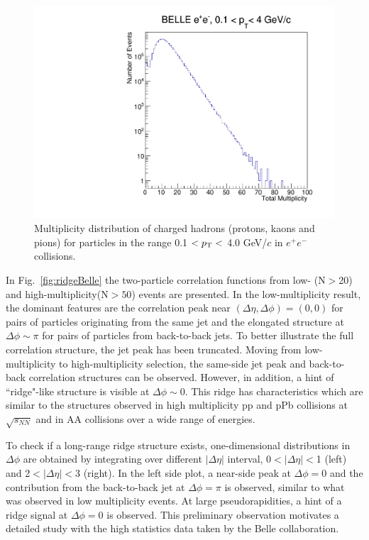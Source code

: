 \begin{figure}[!htb]
\begin{center}
\includegraphics[width=.45\textwidth]{figures/total_mult.pdf}
\caption{Multiplicity distribution of charged hadrons (protons, kaons and pions) for  particles in the range  0.1 $<p_{\rm T}<$ 4.0 GeV/$c$ in $e^{+}e^{-}$ collisions. }
\label{fig:multHadron} 
\end{center}
\end{figure}

In Fig.~\ref{fig:ridgeBelle} the two-particle correlation functions from low- (N$>$20) and high-multiplicity(N$>50$) events are presented. 
In the low-multiplicity result, the dominant features are the correlation peak near $(\Delta\eta,\Delta\phi)=(0,0)$ for pairs of particles originating from the same jet 
and the elongated structure at $\Delta\phi\sim\pi$ for pairs of particles from back-to-back jets. To better illustrate the full correlation structure, the jet peak has been truncated.
Moving from low-multiplicity to high-multiplicity selection, the same-side jet peak and back-to-back correlation structures can be observed. 
However, in addition, a hint of ``ridge"-like structure is visible at $\Delta\phi \sim$0. This ridge has characteristics which are similar to the structures
observed in high multiplicity pp and pPb collisions at $\sqrt{s_{NN}}$ and in AA collisions over a wide range of energies.

To check if a long-range ridge structure exists, one-dimensional distributions in $\Delta\phi$ are obtained by integrating over different $|\Delta\eta|$ interval, 0$<|\Delta \eta|<$1 (left) and 
2$<|\Delta \eta|<$3 (right). In the left side plot, a near-side peak at $\Delta\phi=$0 and the contribution from the back-to-back jet at $\Delta\phi=\pi$ is observed, similar to what was observed in low multiplicity events. At large pseudorapidities, 
a hint of a ridge signal at $\Delta\phi=0$ is observed. This preliminary observation motivates a detailed study with the high statistics data taken by the Belle collaboration. 

